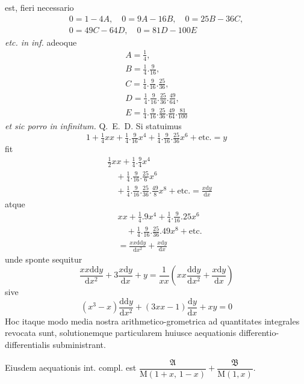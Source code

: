 est, fieri necessario
\[
\begin{gathered}0=1-4A,\quad 0=9A-16B,\quad 0=25B-36C,\\[6pt]
0=49C-64D,\quad 0=81D-100E\end{gathered}
\]
\textit{etc. in inf.} adeoque
\[
\begin{gathered}A=\tfrac14,\\ B=\tfrac14.\tfrac9{16},\\[6pt]
C=\tfrac14.\tfrac9{16}.\tfrac{25}{36},\\[6pt]
D=\tfrac14.\tfrac9{16}.\tfrac{25}{36}.\tfrac{49}{64},\\[6pt]
E=\tfrac14.\tfrac9{16}.\tfrac{25}{36}.\tfrac{49}{64}.\tfrac{81}{100}\end{gathered}
\]
\textit{et sic porro in infinitum.} Q.~E.~D.
Si statuimus
\[
1+\tfrac14xx+\tfrac14.\tfrac9{16}x^4
+\tfrac14.\tfrac9{16}.\tfrac{25}{36}x^6+\text{etc.}=y
\]
fit
\[
\begin{aligned}&\tfrac12xx+\tfrac14.\tfrac94x^4\\&\quad+\tfrac14.\tfrac9{16}.\tfrac{25}{6}x^6\\&\quad+\tfrac14.\tfrac9{16}.\tfrac{25}{36}.\tfrac{49}{8}x^8
+\text{etc.}=\frac{x\mathrm{d}y}{\mathrm{d}x}\end{aligned}
\]
atque
\[
\begin{aligned}&xx+\tfrac14.9x^4+\tfrac14.\tfrac9{16}.25x^6\\&\quad+\tfrac14.\tfrac9{16}.\tfrac{25}{36}.49x^8+\text{etc.}\\&=\frac{xx\mathrm{dd}y}{\mathrm{d}x^2}+\frac{x\mathrm{d}y}{\mathrm{d}x}\end{aligned}
\]
unde sponte sequitur
\[
\frac{xx\mathrm{dd}y}{\mathrm{d}x^2}+3\frac{x\mathrm{d}y}{\mathrm{d}x}+y
=\frac1{xx}\left(xx\frac{\mathrm{dd}y}{\mathrm{d}x^2}+\frac{x\mathrm{d}y}{\mathrm{d}x}\right)
\]
sive
\[
(x^3-x)\frac{\mathrm{dd}y}{\mathrm{d}x^2}
+(3xx-1)\frac{\mathrm{d}y}{\mathrm{d}x}+xy=0
\]
Hoc itaque modo media nostra arithmetico-grometrica ad quantitates integrales
revocata sunt, solutionemque particularem huiusce aequationis differentio-differentialis subministrant.

Eiusdem aequationis int. compl. est
\(\dfrac{\mathfrak{A}}{\mathrm{M}(1+x,\,1-x)}+\dfrac{\mathfrak{B}}{\mathrm{M}(1,x)}\).

